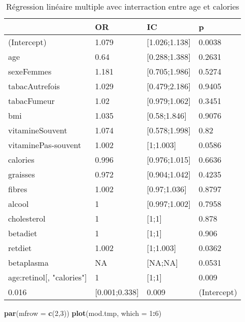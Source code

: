 \documentclass[]{article}
\newenvironment{Shaded}{\begin{snugshade}}{\end{snugshade}}
\newcommand{\KeywordTok}[1]{\textcolor[rgb]{0.13,0.29,0.53}{\textbf{#1}}}
\newcommand{\DataTypeTok}[1]{\textcolor[rgb]{0.13,0.29,0.53}{#1}}
\newcommand{\DecValTok}[1]{\textcolor[rgb]{0.00,0.00,0.81}{#1}}
\newcommand{\OperatorTok}[1]{\textcolor[rgb]{0.81,0.36,0.00}{\textbf{#1}}}
\newcommand{\NormalTok}[1]{#1}
\begin{document}
\begin{table}

\caption{\label{tab:unnamed-chunk-83}Régression linéaire multiple avec interraction entre age et calories}
\centering
\begin{tabular}[t]{l|l|l|l}
\hline
  & OR & IC & p\\
\hline
\rowcolor[HTML]{BBD2E1}  (Intercept) & 1.079 & [1.026;1.138] & 0.0038\\
\hline
age & 0.64 & [0.288;1.388] & 0.2631\\
\hline
\rowcolor[HTML]{BBD2E1}  sexeFemmes & 1.181 & [0.705;1.986] & 0.5274\\
\hline
tabacAutrefois & 1.029 & [0.479;2.186] & 0.9405\\
\hline
\rowcolor[HTML]{BBD2E1}  tabacFumeur & 1.02 & [0.979;1.062] & 0.3451\\
\hline
bmi & 1.035 & [0.58;1.846] & 0.9076\\
\hline
\rowcolor[HTML]{BBD2E1}  vitamineSouvent & 1.074 & [0.578;1.998] & 0.82\\
\hline
vitaminePas-souvent & 1.002 & [1;1.003] & 0.0586\\
\hline
\rowcolor[HTML]{BBD2E1}  calories & 0.996 & [0.976;1.015] & 0.6636\\
\hline
graisses & 0.972 & [0.904;1.042] & 0.4235\\
\hline
\rowcolor[HTML]{BBD2E1}  fibres & 1.002 & [0.97;1.036] & 0.8797\\
\hline
alcool & 1 & [0.997;1.002] & 0.7958\\
\hline
\rowcolor[HTML]{BBD2E1}  cholesterol & 1 & [1;1] & 0.878\\
\hline
betadiet & 1 & [1;1] & 0.906\\
\hline
\rowcolor[HTML]{BBD2E1}  retdiet & 1.002 & [1;1.003] & 0.0362\\
\hline
betaplasma & NA & [NA;NA] & 0.0531\\
\hline
\rowcolor[HTML]{BBD2E1}  age:retinol[, "calories"] & 1 & [1;1] & 0.009\\
\hline
0.016 & [0.001;0.338] & 0.009 & (Intercept)\\
\hline
\end{tabular}
\end{table}

\begin{Shaded}
\begin{Highlighting}[]
\KeywordTok{par}\NormalTok{(}\DataTypeTok{mfrow =} \KeywordTok{c}\NormalTok{(}\DecValTok{2}\NormalTok{,}\DecValTok{3}\NormalTok{))}
\KeywordTok{plot}\NormalTok{(mod.tmp, }\DataTypeTok{which =} \DecValTok{1}\OperatorTok{:}\DecValTok{6}\NormalTok{)}
\end{Highlighting}
\end{Shaded}
\end{document}
